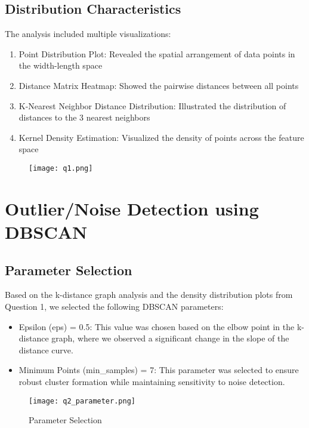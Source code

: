 \documentclass[12pt]{article}
\begin{document}
\subsection{Distribution Characteristics}
The analysis included multiple visualizations:
\begin{enumerate}
    \item Point Distribution Plot: Revealed the spatial arrangement of data points in the width-length space
    \item Distance Matrix Heatmap: Showed the pairwise distances between all points
    \item K-Nearest Neighbor Distance Distribution: Illustrated the distribution of distances to the 3 nearest neighbors
    \item Kernel Density Estimation: Visualized the density of points across the feature space
\end{enumerate}


\begin{figure}[H]
    \centering
    \texttt{[image: q1.png]}
\end{figure}

\section{Outlier/Noise Detection using DBSCAN}

\subsection{Parameter Selection}
Based on the k-distance graph analysis and the density distribution plots from Question 1, we selected the following DBSCAN parameters:
\begin{itemize}
    \item Epsilon (eps) = 0.5: This value was chosen based on the elbow point in the k-distance graph, where we observed a significant change in the slope of the distance curve.
    \item Minimum Points (min\_samples) = 7: This parameter was selected to ensure robust cluster formation while maintaining sensitivity to noise detection.
\end{itemize}

\begin{figure}[H]
    \centering
    \texttt{[image: q2\_parameter.png]}
    \caption{Parameter Selection}
    \label{fig:enter-label}
\end{figure}
\end{document}
